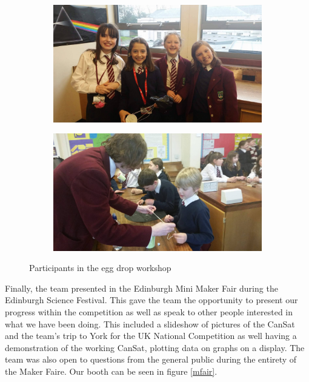 \documentclass[]{report}
\begin{document}
	\begin{figure}
		\centering
		\begin{subfigure}{.5\textwidth}
			\centering
			\includegraphics[width=.8\linewidth]{ed1.jpg}
		\end{subfigure}%
		\begin{subfigure}{.5\textwidth}
			\centering
			\includegraphics[width=0.8\linewidth, angle=0]{ed2.jpg}
		\end{subfigure}
		\caption{Participants in the egg drop workshop}
		\label{eggdrop}
	\end{figure}
	
	Finally, the team presented in the Edinburgh Mini Maker Fair during the Edinburgh Science Festival. This gave the team the opportunity to present our progress within the competition as well as speak to other people interested in what we have been doing. This included a slideshow of pictures of the CanSat and the team's trip to York for the UK National Competition as well having a demonstration of the working CanSat, plotting data on graphs on a display. The team was also open to questions from the general public during the entirety of the Maker Faire. Our booth can be seen in figure \ref{mfair}.
	
\end{document}
